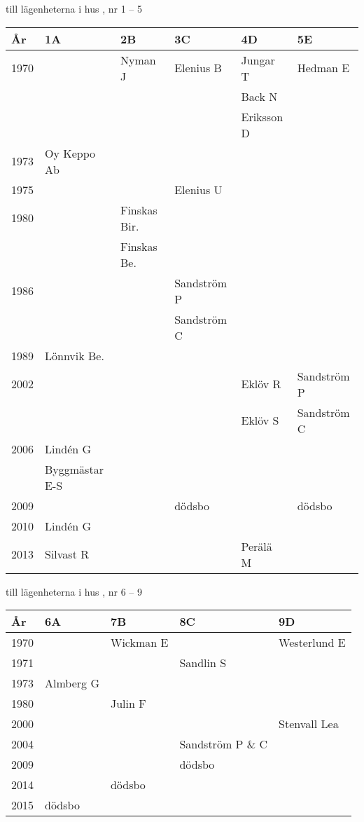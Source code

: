  till lägenheterna i hus , nr 1 – 5
\begin{center}
  \begin{tabular}{l l l l l l}
    År & 1A & 2B & 3C & 4D & 5E \\ \hline
    1970 &  & Nyman J & Elenius B & Jungar T & Hedman E \\
      &  &  &  & Back N &  \\
      &  &  &  & Eriksson D &  \\
    1973 & Oy Keppo Ab &   &   &   &   \\
    1975 &   &   & Elenius U &   &   \\
    1980 &   & Finskas Bir. &   &   &   \\
      &   & Finskas Be. &   &   &   \\
    1986 &   &   & Sandström P &   &   \\
      &   &   & Sandström C &   &   \\
    1989 & Lönnvik Be. &   &   &   &   \\
    2002 &   &   &   & Eklöv R & Sandström P \\
      &   &   &   & Eklöv S & Sandström C \\
    2006 & Lindén G &   &   &   &   \\
      & Byggmästar E-S &   &   &   &   \\
    2009 &   &   & dödsbo &   & dödsbo \\
    2010 & Lindén G &   &   &   &   \\
    2013 & Silvast R &   &   & Perälä M &   \\
  \end{tabular}
\end{center}



 till lägenheterna i hus , nr 6 – 9
\begin{center}
  \begin{tabular}{l l l l l}
    År & 6A & 7B & 8C & 9D \\ \hline
    1970 &   & Wickman E &   & Westerlund E \\
    1971 &   &   & Sandlin S &  \\
    1973 & Almberg G &   &   &  \\
    1980 &   & Julin F &   &  \\
    2000 &   &   &   & Stenvall Lea \\
    2004 &   &   & Sandström P \& C &  \\
    2009 &   &   & dödsbo &  \\
    2014 &   & dödsbo &   &  \\
    2015 & dödsbo &   &   &  \\
  \end{tabular}
\end{center}

